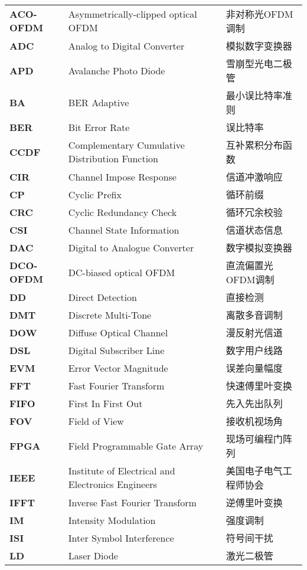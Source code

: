 ﻿%
\begin{terminology}
    \begin{longtable}{lll}
	
	
\bf{ACO-OFDM}	&	Asymmetrically-clipped optical OFDM	&	非对称光OFDM调制	\\
\bf{ADC}	&	Analog to Digital Converter	&	模拟数字变换器	\\
\bf{APD}	&	Avalanche Photo Diode	&	雪崩型光电二极管	\\
\bf{BA}	&	BER Adaptive	&	最小误比特率准则	\\
\bf{BER}	&	Bit Error Rate	&	误比特率	\\
\bf{CCDF}	&	Complementary Cumulative Distribution Function	&	互补累积分布函数	\\
\bf{CIR}	&	Channel Impose Response	&	信道冲激响应	\\
\bf{CP}	&	Cyclic Prefix	&	循环前缀	\\
\bf{CRC}	&	Cyclic Redundancy Check	&	循环冗余校验	\\
\bf{CSI}	&	Channel State Information	&	信道状态信息	\\
\bf{DAC}	&	Digital to Analogue Converter	&	数字模拟变换器	\\
\bf{DCO-OFDM}	&	DC-biased optical OFDM	&	直流偏置光OFDM调制	\\
\bf{DD}	&	Direct Detection	&	直接检测	\\
\bf{DMT}	&	Discrete Multi-Tone	&	离散多音调制	\\
\bf{DOW}	&	Diffuse Optical Channel	&	漫反射光信道	\\
\bf{DSL}	&	Digital Subscriber Line	&	数字用户线路	\\
\bf{EVM}	&	Error Vector Magnitude	&	误差向量幅度	\\
\bf{FFT}	&	Fast Fourier Transform	&	快速傅里叶变换	\\
\bf{FIFO}	&	First In First Out	&	先入先出队列	\\
\bf{FOV}	&	Field of View	&	接收机视场角	\\
\bf{FPGA}	&	Field Programmable Gate Array	&	现场可编程门阵列	\\
\bf{IEEE}	&	Institute of Electrical and Electronics Engineers	&	美国电子电气工程师协会	\\
\bf{IFFT}	&	Inverse Fast Fourier Transform	&	逆傅里叶变换	\\
\bf{IM}	&	Intensity Modulation	&	强度调制	\\
\bf{ISI}	&	Inter Symbol Interference	&	符号间干扰	\\
\bf{LD}	&	Laser Diode	&	激光二极管	\\

\end{longtable}
\end{terminology}
